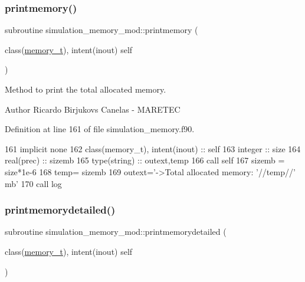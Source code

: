 \subsubsection{\texorpdfstring{printmemory()}{printmemory()}}
{\footnotesize\ttfamily subroutine simulation\+\_\+memory\+\_\+mod\+::printmemory (\begin{DoxyParamCaption}\item[{class(\mbox{\hyperlink{structsimulation__memory__mod_1_1memory__t}{memory\+\_\+t}}), intent(inout)}]{self }\end{DoxyParamCaption})\hspace{0.3cm}{\ttfamily [private]}}



Method to print the total allocated memory. 

\begin{DoxyAuthor}{Author}
Ricardo Birjukovs Canelas -\/ M\+A\+R\+E\+T\+EC 
\end{DoxyAuthor}


Definition at line 161 of file simulation\+\_\+memory.\+f90.


\begin{DoxyCode}
161     \textcolor{keywordtype}{implicit none}
162     \textcolor{keywordtype}{class}(memory\_t), \textcolor{keywordtype}{intent(inout)} :: self
163     \textcolor{keywordtype}{integer} :: size
164     \textcolor{keywordtype}{real(prec)} :: sizemb
165     \textcolor{keywordtype}{type}(string) :: outext,temp
166     \textcolor{keyword}{call }self%
167     sizemb = size*1e-6
168     temp= sizemb
169     outext=\textcolor{stringliteral}{'->Total allocated memory: '}//temp//\textcolor{stringliteral}{' mb'}
170     \textcolor{keyword}{call }log%
\end{DoxyCode}
\mbox{\label{namespacesimulation__memory__mod_a894bd4ec7462fd634d328ee5be4c6483}} 
\subsubsection{\texorpdfstring{printmemorydetailed()}{printmemorydetailed()}}
{\footnotesize\ttfamily subroutine simulation\+\_\+memory\+\_\+mod\+::printmemorydetailed (\begin{DoxyParamCaption}\item[{class(\mbox{\hyperlink{structsimulation__memory__mod_1_1memory__t}{memory\+\_\+t}}), intent(inout)}]{self }\end{DoxyParamCaption})\hspace{0.3cm}{\ttfamily [private]}}



